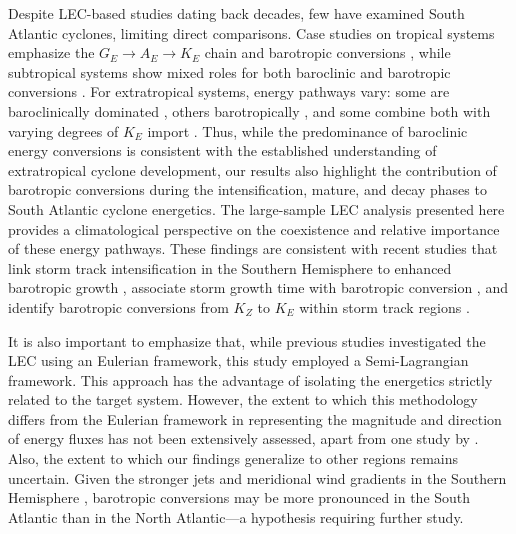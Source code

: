 \documentclass[pdflatex,sn-chicago]{sn-jnl}%
\theoremstyle{plain}
\theoremstyle{definition}
\theoremstyle{remark}
\theoremstyle{definition}
\begin{document}
Despite LEC-based studies dating back decades, few have examined South Atlantic cyclones, limiting direct comparisons. Case studies on tropical systems emphasize the $G_E \rightarrow A_E \rightarrow K_E$ chain and barotropic conversions \citep{brennan1980zonal,veiga2008analysis}, while subtropical systems show mixed roles for both baroclinic and barotropic conversions \citep{michaelides1987limited,dias2013synoptic,pezza2014large,cavicchia2018energetics}. For extratropical systems, energy pathways vary: some are baroclinically dominated \citep{dias2011energy,black2013universal}, others barotropically \citep{michaelides1992spatial,dias2011energy}, and some combine both with varying degrees of $K_E$ import \citep{wahab2002mechanism,bulic2006limited,pezza2010environmental}. Thus, while the predominance of baroclinic energy conversions is consistent with the established understanding of extratropical cyclone development, our results also highlight the contribution of barotropic conversions during the intensification, mature, and decay phases to South Atlantic cyclone energetics. The large-sample LEC analysis presented here provides a climatological perspective on the coexistence and relative importance of these energy pathways. These findings are consistent with recent studies that link storm track intensification in the Southern Hemisphere to enhanced barotropic growth \citep{chemke2022intensification}, associate storm growth time with barotropic conversion \citep{hadas2025lagrangian}, and identify barotropic conversions from $K_Z$ to $K_E$ within storm track regions \citep{liu2024systematic}.

It is also important to emphasize that, while previous studies investigated the LEC using an Eulerian framework, this study employed a Semi-Lagrangian framework. This approach has the advantage of isolating the energetics strictly related to the target system. However, the extent to which this methodology differs from the Eulerian framework in representing the magnitude and direction of energy fluxes has not been extensively assessed, apart from one study by \citet{michaelides1999quasi}. Also, the extent to which our findings generalize to other regions remains uncertain. Given the stronger jets and meridional wind gradients in the Southern Hemisphere \citep[e.g.,][]{swart2019canadian,jain2023monsoon,savita2023assessment}, barotropic conversions may be more pronounced in the South Atlantic than in the North Atlantic—a hypothesis requiring further study.
\end{document}
